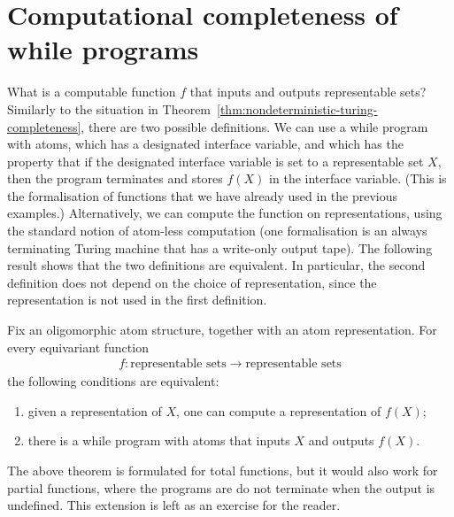 \section{Computational completeness of while programs}
\label{sec:church-turing} 
What is a computable function $f$ that inputs and outputs  representable sets?  Similarly to the situation in Theorem~\ref{thm:nondeterministic-turing-completeness}, there are two possible definitions. We can use a while program with atoms, which has a designated interface variable, and which has the property that if the designated interface variable is set to a representable set $X$, then the program terminates and stores $f(X)$ in the interface variable. (This is the formalisation of functions that we have already used in the previous examples.) Alternatively, we can compute the function on representations, using the standard notion of atom-less computation (one formalisation is an always terminating Turing machine that has a write-only output tape). The following result shows that the two definitions are equivalent.  In particular, the second definition does not depend on the choice of representation, since the representation is not used in the first definition. 

\begin{theorem} \label{thm:computational-completeness} Fix an oligomorphic atom structure, together with an atom representation. For every equivariant function 
\begin{align*}
f : \text{representable sets} \to \text{representable sets} 
\end{align*}
the following conditions are equivalent:
\begin{enumerate}
	\item given a representation of $X$, one can  compute a representation of $f(X)$;
	\item there is a while program with atoms that inputs $X$ and outputs $f(X)$.
\end{enumerate}
\end{theorem}

The above theorem is formulated for total functions, but it would also work for partial functions, where the programs are do not terminate when the output is undefined. This extension is left as an exercise for the reader.





